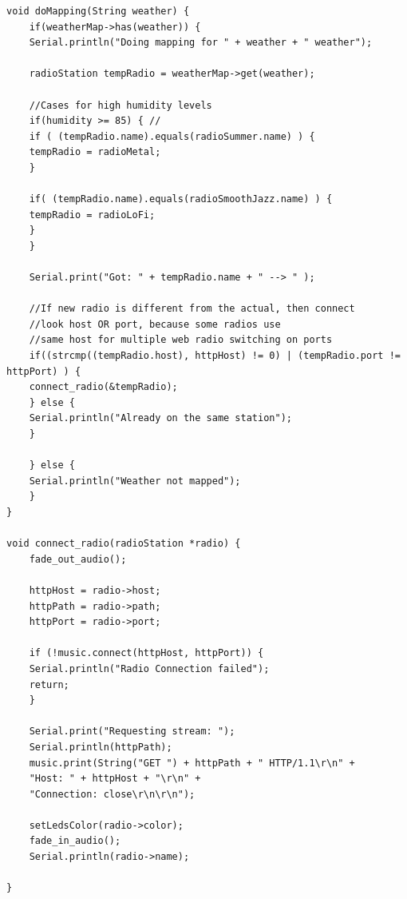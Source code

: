 \documentclass[12pt,a4paper]{report}
\begin{document}
\begin{lstlisting}[style=customC++Arduino, label={Codice 1.2}, caption={Codice 1.2}, title={Codice 1.2 : libreria TaskScheduler}, basicstyle=\linespread{0.7}\footnotesize\ttfamily]
void doMapping(String weather) {
	if(weatherMap->has(weather)) {
	Serial.println("Doing mapping for " + weather + " weather");
	
	radioStation tempRadio = weatherMap->get(weather);
	
	//Cases for high humidity levels 
	if(humidity >= 85) { //
	if ( (tempRadio.name).equals(radioSummer.name) ) {
	tempRadio = radioMetal;
	}
	
	if( (tempRadio.name).equals(radioSmoothJazz.name) ) {
	tempRadio = radioLoFi;
	}
	}
	
	Serial.print("Got: " + tempRadio.name + " --> " );
	
	//If new radio is different from the actual, then connect
	//look host OR port, because some radios use
	//same host for multiple web radio switching on ports
	if((strcmp((tempRadio.host), httpHost) != 0) | (tempRadio.port != httpPort) ) {
	connect_radio(&tempRadio);
	} else {
	Serial.println("Already on the same station");
	}
	
	} else {
	Serial.println("Weather not mapped");
	}
}

void connect_radio(radioStation *radio) {
	fade_out_audio();
	
	httpHost = radio->host;
	httpPath = radio->path;
	httpPort = radio->port;
	
	if (!music.connect(httpHost, httpPort)) {
	Serial.println("Radio Connection failed");
	return;
	}
	
	Serial.print("Requesting stream: ");
	Serial.println(httpPath);
	music.print(String("GET ") + httpPath + " HTTP/1.1\r\n" +
	"Host: " + httpHost + "\r\n" +
	"Connection: close\r\n\r\n");
	
	setLedsColor(radio->color);
	fade_in_audio();
	Serial.println(radio->name);

}
\end{lstlisting}



\end{document}
